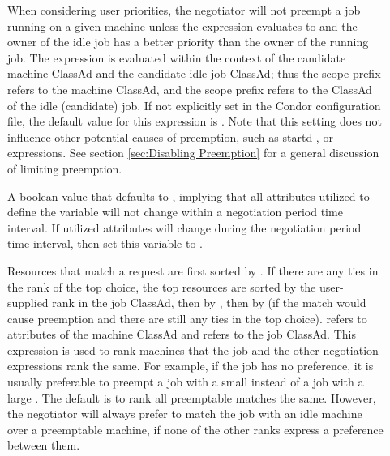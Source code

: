 \begin{description}
\item[]
  \label{param:PreemptionRequirements} When considering user priorities, the negotiator will not preempt
  a job running on a given machine unless the
   expression evaluates to  and the
  owner of the idle job has a better priority than the owner of the
  running job. 
  The  expression is evaluated within the
  context of the candidate machine ClassAd and the candidate idle job
  ClassAd; thus the \verb@MY@ scope prefix refers to the machine ClassAd,
  and the \verb@TARGET@ scope prefix refers to the ClassAd of the idle
  (candidate) job.  
  If not explicitly set in the Condor configuration file, the default value
  for this expression is .
  Note that this setting does not
  influence other potential causes of preemption, such as startd
  , or  expressions.  See
  section \ref{sec:Disabling Preemption} for a general discussion of
  limiting preemption.

\item[]
  \label{param:PreemptionRequirementsStable} 
  A boolean value that defaults to , implying that all attributes
  utilized to define the  variable will not
  change within a negotiation period time interval.
  If utilized attributes will change during the 
  negotiation period time interval, then set this variable to . 

\item[] \label{param:PreemptionRank} Resources
  that match a request are first sorted by
  .  If there are any ties in the
  rank of the top choice, the top resources are sorted by the
  user-supplied rank in the job ClassAd, then by
  , then by
   (if the match would cause preemption and
  there are still any ties in the top choice).  \verb@MY@ refers to
  attributes of the machine ClassAd and \verb@TARGET@ refers to the
  job ClassAd.  This expression is used to rank machines that the job
  and the other negotiation expressions rank the same.  For example,
  if the job has no preference, it is usually preferable to preempt a
  job with a small  instead of a job with a large
  .  The default is to rank all preemptable matches
  the same.  However, the negotiator will always prefer to match the
  job with an idle machine over a preemptable machine, if none of the
  other ranks express a preference between them.


\end{description}
